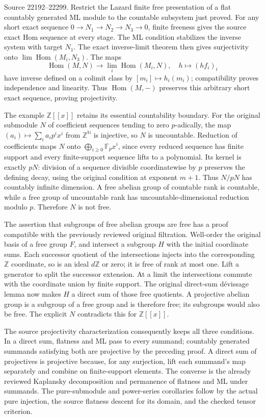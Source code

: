 Source 22192--22299. Restrict the Lazard finite free presentation of a flat countably generated ML module to the countable subsystem just proved. For any short exact sequence \(0\to N_1\to N_2\to N_3\to0\), finite freeness gives the source exact Hom sequence at every stage. The ML condition stabilizes the inverse system with target \(N_1\). The exact inverse-limit theorem then gives surjectivity onto \(\lim\operatorname{Hom}(M_i,N_3)\). The maps \[
\operatorname{Hom}(M,N)\longrightarrow\lim_i\operatorname{Hom}(M_i,N),
\quad h\longmapsto(hf_i)_i
\] have inverse defined on a colimit class by \([m_i]\mapsto h_i(m_i)\); compatibility proves independence and linearity. Thus \(\operatorname{Hom}(M,-)\) preserves this arbitrary short exact sequence, proving projectivity.

The example \(\mathbb Z[[x]]\) retains its essential countability boundary. For the original submodule \(N\) of coefficient sequences tending to zero \(p\)-adically, the map \((a_i)\mapsto\sum_i a_i p^i x^i\) from \(\mathbb Z^{\mathbb N}\) is injective, so \(N\) is uncountable. Reduction of coefficients maps \(N\) onto \(\bigoplus_{i\geq0}\mathbb F_p x^i\), since every reduced sequence has finite support and every finite-support sequence lifts to a polynomial. Its kernel is exactly \(pN\): division of a sequence divisible coordinatewise by \(p\) preserves the defining decay, using the original condition at exponent \(m+1\). Thus \(N/pN\) has countably infinite dimension. A free abelian group of countable rank is countable, while a free group of uncountable rank has uncountable-dimensional reduction modulo \(p\). Therefore \(N\) is not free.

The assertion that subgroups of free abelian groups are free has a proof compatible with the previously reviewed original filtration. Well-order the original basis of a free group \(F\), and intersect a subgroup \(H\) with the initial coordinate sums. Each successor quotient of the intersections injects into the corresponding \(\mathbb Z\) coordinate, so is an ideal \(d\mathbb Z\) or zero; it is free of rank at most one. Lift a generator to split the successor extension. At a limit the intersections commute with the coordinate union by finite support. The original direct-sum dévissage lemma now makes \(H\) a direct sum of those free quotients. A projective abelian group is a subgroup of a free group and is therefore free; its subgroups would also be free. The explicit \(N\) contradicts this for \(\mathbb Z[[x]]\).

The source projectivity characterization consequently keeps all three conditions. In a direct sum, flatness and ML pass to every summand; countably generated summands satisfying both are projective by the preceding proof. A direct sum of projectives is projective because, for any surjection, lift each summand's map separately and combine on finite-support elements. The converse is the already reviewed Kaplansky decomposition and permanence of flatness and ML under summands. The pure-submodule and power-series corollaries follow by the actual pure injection, the source flatness descent for its domain, and the checked tensor criterion.

